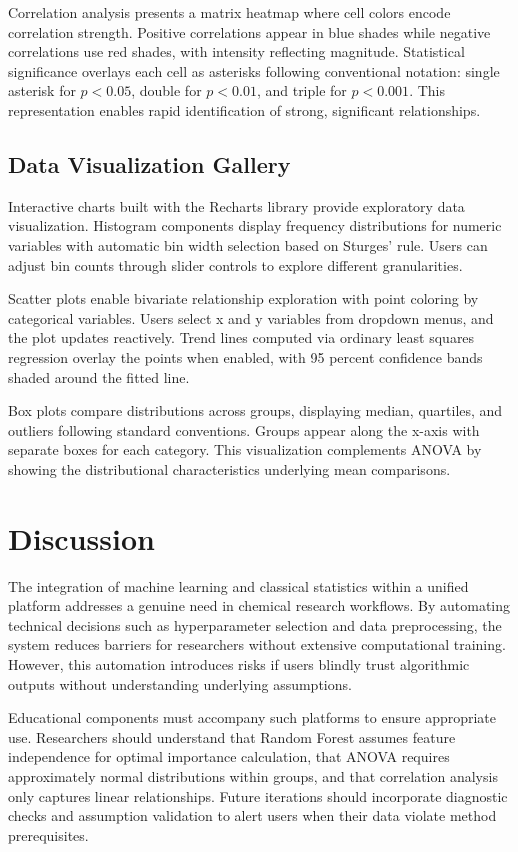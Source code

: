 \documentclass[conference]{IEEEtran}
\begin{document}
Correlation analysis presents a matrix heatmap where cell colors encode correlation strength. Positive correlations appear in blue shades while negative correlations use red shades, with intensity reflecting magnitude. Statistical significance overlays each cell as asterisks following conventional notation: single asterisk for $p < 0.05$, double for $p < 0.01$, and triple for $p < 0.001$. This representation enables rapid identification of strong, significant relationships.

\subsection{Data Visualization Gallery}

Interactive charts built with the Recharts library provide exploratory data visualization. Histogram components display frequency distributions for numeric variables with automatic bin width selection based on Sturges' rule. Users can adjust bin counts through slider controls to explore different granularities.

Scatter plots enable bivariate relationship exploration with point coloring by categorical variables. Users select x and y variables from dropdown menus, and the plot updates reactively. Trend lines computed via ordinary least squares regression overlay the points when enabled, with 95 percent confidence bands shaded around the fitted line.

Box plots compare distributions across groups, displaying median, quartiles, and outliers following standard conventions. Groups appear along the x-axis with separate boxes for each category. This visualization complements ANOVA by showing the distributional characteristics underlying mean comparisons.

\section{Discussion}

The integration of machine learning and classical statistics within a unified platform addresses a genuine need in chemical research workflows. By automating technical decisions such as hyperparameter selection and data preprocessing, the system reduces barriers for researchers without extensive computational training. However, this automation introduces risks if users blindly trust algorithmic outputs without understanding underlying assumptions.

Educational components must accompany such platforms to ensure appropriate use. Researchers should understand that Random Forest assumes feature independence for optimal importance calculation, that ANOVA requires approximately normal distributions within groups, and that correlation analysis only captures linear relationships. Future iterations should incorporate diagnostic checks and assumption validation to alert users when their data violate method prerequisites.
\end{document}
